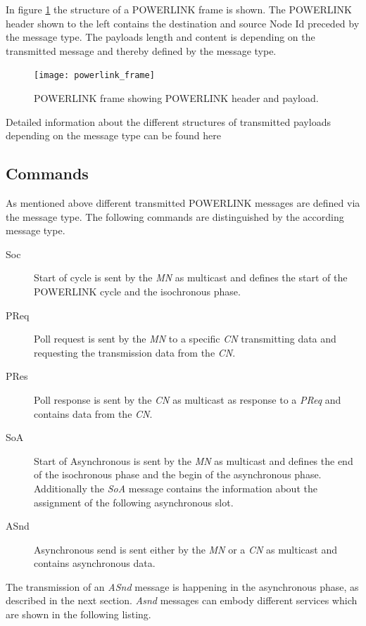 In figure \ref{fig:powerlink_frame} the structure of a POWERLINK frame is shown.
The POWERLINK header shown to the left contains the destination and source Node Id preceded by the message type.
The payloads length and content is depending on the transmitted message and thereby defined by the message type. \cite[section 4.6.1.1]{epsg_epsg_2013}

\begin{figure}
    \centering
    \texttt{[image: powerlink\_frame]}
    \caption{POWERLINK frame showing POWERLINK header and payload.}
    \label{fig:powerlink_frame}
\end{figure}

Detailed information about the different structures of transmitted payloads depending on the message type can be found here \cite[section 4.6.1.1.1]{epsg_epsg_2013}

\subsection{Commands}
\label{sec:oplk_powerlink_commands}

As mentioned above different transmitted POWERLINK messages are defined via the message type.
The following commands are distinguished by the according message type.

\begin{description}
    \item[Soc] Start of cycle is sent by the \emph{MN} as multicast and defines the start of the POWERLINK cycle and the isochronous phase.
    \item[PReq] Poll request is sent by the \emph{MN} to a specific \emph{CN} transmitting data and requesting the transmission data from the \emph{CN}.
    \item[PRes] Poll response is sent by the \emph{CN} as multicast as response to a \emph{PReq} and contains data from the \emph{CN}.
    \item[SoA] Start of Asynchronous is sent by the \emph{MN} as multicast and defines the end of the isochronous phase and the begin of the asynchronous phase.
    Additionally the \emph{SoA} message contains the information about the assignment of the following asynchronous slot.
    \item[ASnd] Asynchronous send is sent either by the \emph{MN} or a \emph{CN} as multicast and contains asynchronous data.
\end{description}

The transmission of an \emph{ASnd} message is happening in the asynchronous phase, as described in the next section.
\emph{Asnd} messages can embody different services which are shown in the following listing.\cite[section 4.6.1.1.6.1]{epsg_epsg_2013}

